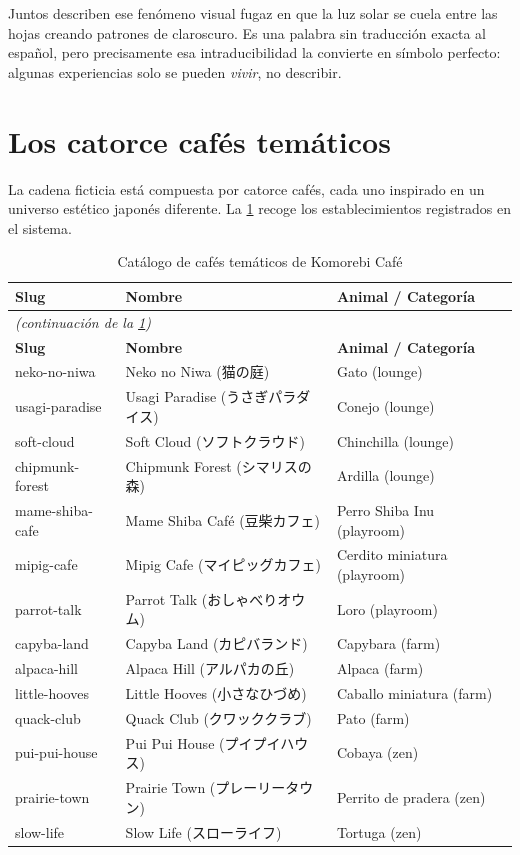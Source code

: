 \documentclass[12pt,a4paper,twoside,openright]{report}
\begin{document}
Juntos describen ese fenómeno visual fugaz en que la luz solar se cuela entre las hojas
creando patrones de claroscuro. Es una palabra sin traducción exacta al español, pero
precisamente esa intraducibilidad la convierte en símbolo perfecto: algunas experiencias
solo se pueden \textit{vivir}, no describir.

\section{Los catorce cafés temáticos}
\label{sec:cafes}

La cadena ficticia está compuesta por catorce cafés, cada uno inspirado en un universo
estético japonés diferente. La \cref{tab:cafes} recoge los establecimientos registrados
en el sistema.

\begin{longtable}{@{}lll@{}}
  \caption{Catálogo de cafés temáticos de Komorebi Café}
  \label{tab:cafes}\\
  \toprule
  \textbf{Slug} & \textbf{Nombre} & \textbf{Animal / Categoría}\\
  \midrule
  \endfirsthead
  \multicolumn{3}{l}{\footnotesize\textit{(continuación de la \cref{tab:cafes})}}\\
  \toprule
  \textbf{Slug} & \textbf{Nombre} & \textbf{Animal / Categoría}\\
  \midrule
  \endhead
  \bottomrule
  \endfoot
  neko-no-niwa       & Neko no Niwa (猫の庭)         & Gato (lounge)\\
  usagi-paradise     & Usagi Paradise (うさぎパラダイス) & Conejo (lounge)\\
  soft-cloud         & Soft Cloud (ソフトクラウド)     & Chinchilla (lounge)\\
  chipmunk-forest    & Chipmunk Forest (シマリスの森)  & Ardilla (lounge)\\
  mame-shiba-cafe    & Mame Shiba Café (豆柴カフェ)   & Perro Shiba Inu (playroom)\\
  mipig-cafe         & Mipig Cafe (マイピッグカフェ)   & Cerdito miniatura (playroom)\\
  parrot-talk        & Parrot Talk (おしゃべりオウム)  & Loro (playroom)\\
  capyba-land        & Capyba Land (カピバランド)      & Capybara (farm)\\
  alpaca-hill        & Alpaca Hill (アルパカの丘)      & Alpaca (farm)\\
  little-hooves      & Little Hooves (小さなひづめ)   & Caballo miniatura (farm)\\
  quack-club         & Quack Club (クワッククラブ)     & Pato (farm)\\
  pui-pui-house      & Pui Pui House (プイプイハウス)  & Cobaya (zen)\\
  prairie-town       & Prairie Town (プレーリータウン) & Perrito de pradera (zen)\\
  slow-life          & Slow Life (スローライフ)        & Tortuga (zen)\\
\end{longtable}
\end{document}
